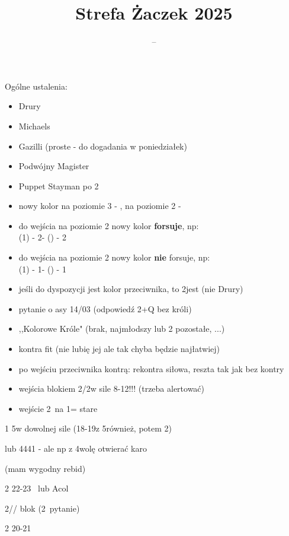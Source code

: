\documentclass[12pt, a4paper]{report}
\title{\spades\clubs Strefa Żaczek 2025 \xdiams\xhearts}
\author{--}
\begin{document}
\maketitle



Ogólne ustalenia:
\begin{itemize}
	\item Drury
	\item Michaels
	\item Gazilli (proste - do dogadania w poniedziałek)
	\item Podwójny Magister
	\item Puppet Stayman po 2\nt
	\item nowy kolor na poziomie 3 - \gf, na poziomie 2 - \nf
	\item do wejścia na poziomie 2 nowy kolor \textbf{forsuje}, np:\\ (1\spades) - 2\clubs - (\pass) - 2\hearts
	\item do wejścia na poziomie 2 nowy kolor \textbf{nie} forsuje, np:\\ (1\clubs) - 1\hearts - (\pass) - 1\spades
	\item jeśli do dyspozycji jest kolor przeciwnika, to 2\clubs jest \nat (nie Drury)
	\item pytanie o asy 14/03 (odpowiedź 2+Q bez króli)
	\item ,,Kolorowe Króle" (brak, najmłodszy lub 2 pozostałe, ...)
	\item kontra fit (nie lubię jej ale tak chyba będzie najłatwiej)
	\item po wejściu przeciwnika kontrą: rekontra siłowa, reszta tak jak bez kontry
	\item wejścia blokiem 2\hearts/2\spades w sile 8-12!!! (trzeba alertować)
	\item wejście 2\diams\ na 1\clubs = stare
\end{itemize}

\vspace{2cm}

\begin{options}[1]
	\item[1\diams] 5\diams w dowolnej sile (18-19\bal z 5\diams również, potem 2\nt)
\item[] lub 4441 - ale np z 4\clubs wolę otwierać karo
\item[] (mam wygodny rebid)
    \item[2\clubs] 22-23 \bal\ lub Acol
    \item[2\diams/\hearts/\spades] blok \nat (2\nt\ pytanie)
    \item[2\nt] 20-21 \bal
\end{options}
\end{document}
